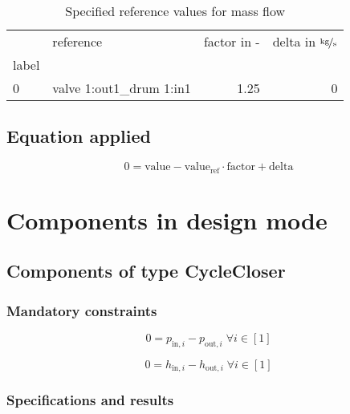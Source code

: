 \documentclass[]{article}
\begin{document}
\begin{table}[H]
\centering
\caption{Specified reference values for mass flow}
\begin{tabular}{llrr}
\toprule
{} &                 reference &  factor in - &  delta in $\unitfrac[]{kg}{s}$ \\
label &                           &              &                                \\
\midrule
0     &  valve 1:out1\_drum 1:in1 &         1.25 &                              0 \\
\bottomrule
\end{tabular}
\end{table}
\subsection{Equation applied}

\begin{equation}
\label{eq:Connection_ref}
0 = \text{value} - \text{value}_\mathrm{ref} \cdot \mathrm{factor} + \text{delta}
\end{equation}

\section{Components in design mode}

\subsection{Components of type CycleCloser}

\subsubsection{Mandatory constraints}

\begin{equation}
\label{eq:CycleCloser_pressure_equality_constraints}
0=p_{\mathrm{in,}i}-p_{\mathrm{out,}i}\; \forall i \in [1]
\end{equation}

\begin{equation}
\label{eq:CycleCloser_enthalpy_equality_constraints}
0=h_{\mathrm{in,}i}-h_{\mathrm{out,}i}\; \forall i \in [1]
\end{equation}


\subsubsection{Specifications and results}
\end{document}
